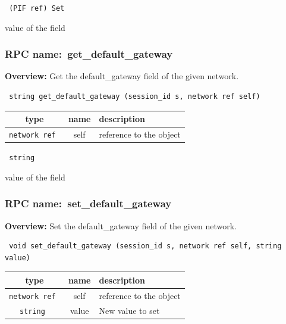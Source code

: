 \vspace{0.3cm}

{\tt 
(PIF ref) Set
}


value of the field
\vspace{0.3cm}
\vspace{0.3cm}
\vspace{0.3cm}
\subsubsection{RPC name:~get\_default\_gateway}

{\bf Overview:} 
Get the default\_gateway field of the given network.

\begin{verbatim} string get_default_gateway (session_id s, network ref self)\end{verbatim}



 
\vspace{0.3cm}
\begin{tabular}{|c|c|p{7cm}|}
 \hline
{\bf type} & {\bf name} & {\bf description} \\ \hline
{\tt network ref } & self & reference to the object \\ \hline 

\end{tabular}

\vspace{0.3cm}

{\tt 
string
}


value of the field
\vspace{0.3cm}
\vspace{0.3cm}
\vspace{0.3cm}
\subsubsection{RPC name:~set\_default\_gateway}

{\bf Overview:} 
Set the default\_gateway field of the given network.

\begin{verbatim} void set_default_gateway (session_id s, network ref self, string value)\end{verbatim}



 
\vspace{0.3cm}
\begin{tabular}{|c|c|p{7cm}|}
 \hline
{\bf type} & {\bf name} & {\bf description} \\ \hline
{\tt network ref } & self & reference to the object \\ \hline 

{\tt string } & value & New value to set \\ \hline 

\end{tabular}

